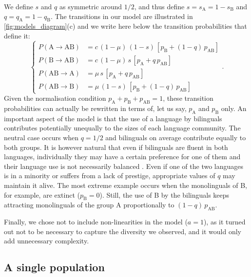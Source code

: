 \documentclass[../thesis.tex]{subfiles}
\begin{document}
We define $s$ and $q$ as symmetric around $1/2$, and thus define $s = s_\text{A} = 1 -
s_\text{B}$ and $q = q_\text{A} = 1 - q_\text{B}$. The transitions in our model are
illustrated in \cref{fig:models_diagram}(c) and we write here below the transition
probabilities that define it:
\begin{equation}
\label{eq:bipref_model}
\left\{
\begin{aligned}
  P (\text{A} \rightarrow \text{AB}) &= c \, (1 - \mu) \, (1-s) \, \left[ p_{\text{B}} + (1-q) \,  p_{\text{AB}} \right] \\
  P (\text{B} \rightarrow \text{AB}) &= c \, (1 - \mu) \, s \, \left[ p_{\text{A}} + q \, p_{\text{AB}} \right] \\
  P (\text{AB} \rightarrow \text{A}) &= \mu \, s \, \left[ p_{\text{A}} + q \, p_{\text{AB}} \right] \\
  P (\text{AB} \rightarrow \text{B}) &= \mu \, (1-s) \, \left[ p_{\text{B}} + (1-q) \, p_{\text{AB}} \right]
\end{aligned}
\right. .
\end{equation}
Given the normalisation condition $p_\text{A} + p_\text{B} + p_\text{AB} = 1$, these
transition probabilities can actually be rewritten in terms of, let us say, $p_\text{A}$
and $p_\text{B}$ only. An important aspect of the model is that the use of a language by
bilinguals contributes potentially unequally to the sizes of each language community.
The neutral case occurs when $q = 1/2$ and bilinguals on average contribute equally to
both groups. It is however natural that even if bilinguals are fluent in both languages,
individually they may have a certain preference for one of them and their language use
is not necessarily balanced \cite{RomaineBilingualMultilingual2012}. Even if one of the
two languages is in a minority or suffers from a lack of prestige, appropriate values of
$q$ may maintain it alive. The most extreme example occurs when the monolinguals of B,
for example, are extinct ($p_{\text{B}} = 0$). Still, the use of B by the bilinguals
keeps attracting monolinguals of the group A proportionally to $(1-q)\, p_{\text{AB}}$.

Finally, we chose not to include non-linearities in the model ($a = 1$), as it turned
out not to be necessary to capture the diversity we observed, and it would only add
unnecessary complexity.


\subsection{A single population}
\end{document}
